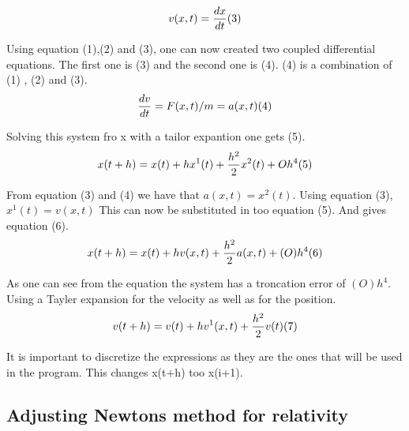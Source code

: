 \documentclass{article}
\begin{document}
    \begin{equation}    \label{eq:diffvelocity}
        v(x,t) = \frac{dx}{dt} (3) \\
    \end{equation}

    Using equation (1),(2) and (3), one can now created two coupled differential equations. The first one is (3) and the second one is (4). (4) is a combination of (1) , (2) and (3). \\

    \begin{equation}    \label{eq:acceleration}
        \frac{dv}{dt} = F(x,t)/m = a(x,t) (4) \\
    \end{equation}

    Solving this system fro x with a tailor expantion one gets (5).\\

    \begin{equation}    \label{eq:positiontaylor}
        x(t+h) = x(t) + hx^{1}(t) + \frac{h^{2}}{2} x^{2}(t) + Oh^{4} (5)\\
    \end{equation}

    From equation (3) and (4) we have that $a(x,t) = x^{2}(t)$. Using equation (3), $x^{1}(t) = v(x,t)$ This can now be substituted in too equation (5). And gives equation (6).  \\

    \begin{equation}    \label{eq:positionfinal}
        x(t+h) = x(t) + h v(x,t) + \frac{h^{2}}{2} a(x,t) + (O)h^{4} (6) \\
    \end{equation}

    As one can see from the equation the system has a troncation error of $(O)h^{4}$.
    Using a Tayler expansion for the velocity as well as for the position. \\

    \begin{equation}    \label{eq:velocityfinal}
        v(t+h) = v(t) + h v^{1}(x,t) + \frac{h^{2}}{2}v(t) (7) \\
    \end{equation}

    It is important to discretize the expressions as they are the ones that will be used in the program. This changes x(t+h) too x(i+1). \\



\subsection{Adjusting Newtons method for relativity}








\end{document}
